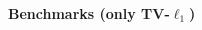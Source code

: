 \documentclass[french]{STIC_poster}
\begin{document}
\begin{frame}[t]
\begin{columns}[t]
\begin{column}{.48\linewidth}
\begin{nbox}[\textwidth]{\textbf{Benchmarks (only TV-$\ell_1$)}}
				\end{nbox}
			\end{column}
			\hfill
		\end{columns}
	\end{frame}

 
\end{document}
